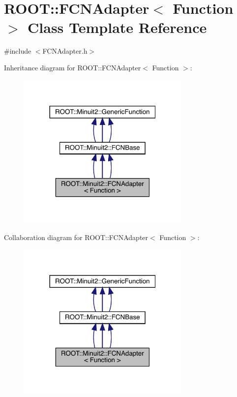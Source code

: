 \hypertarget{classROOT_1_1Minuit2_1_1FCNAdapter}{}\section{R\+O\+OT\+:\+:F\+C\+N\+Adapter$<$ Function $>$ Class Template Reference}
\label{classROOT_1_1Minuit2_1_1FCNAdapter}


{\ttfamily \#include $<$F\+C\+N\+Adapter.\+h$>$}



Inheritance diagram for R\+O\+OT\+:\+:F\+C\+N\+Adapter$<$ Function $>$\+:
\nopagebreak
\begin{figure}[H]
\begin{center}
\leavevmode
\includegraphics[width=240pt]{d8/dc9/classROOT_1_1Minuit2_1_1FCNAdapter__inherit__graph}
\end{center}
\end{figure}


Collaboration diagram for R\+O\+OT\+:\+:F\+C\+N\+Adapter$<$ Function $>$\+:
\nopagebreak
\begin{figure}[H]
\begin{center}
\leavevmode
\includegraphics[width=240pt]{d2/d35/classROOT_1_1Minuit2_1_1FCNAdapter__coll__graph}
\end{center}
\end{figure}
